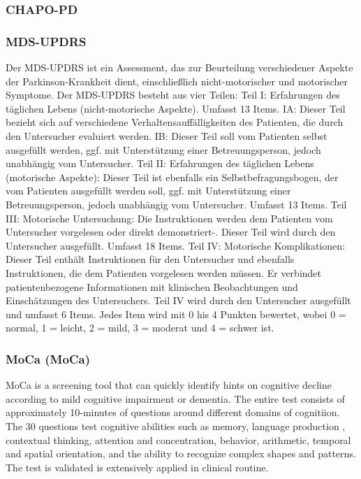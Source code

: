\documentclass[
	a4paper, 
	11.5pt,
	headings=small, 
	twoside, 
	titlepage=firstiscover, 
 	pagesize=auto,
  	version=last,
	open=any,
	BCOR=14mm,
  	chapterprefix=false]{scrbook}
\begin{document}
\subsubsection{\acl{CHAPO-PD}}

\subsubsection{\acl{MDS-UPDRS}}
Der MDS-UPDRS ist ein Assessment, das zur Beurteilung verschiedener Aspekte der Parkinson-Krankheit dient, einschließlich nicht-motorischer und motorischer Symptome. Der MDS-UPDRS besteht aus vier Teilen:
Teil I: Erfahrungen des täglichen Lebens (nicht-motorische Aspekte). Umfasst 13 Items.
IA: Dieser Teil bezieht sich auf verschiedene Verhaltensauffälligkeiten des Patienten, die durch den Untersucher evaluiert werden.
IB: Dieser Teil soll vom Patienten selbst ausgefüllt werden, ggf. mit Unterstützung einer Betreuungsperson, jedoch unabhängig vom Untersucher.
Teil II: Erfahrungen des täglichen Lebens (motorische Aspekte): Dieser Teil ist ebenfalls ein Selbstbefragungsbogen, der vom Patienten ausgefüllt werden soll, ggf. mit Unterstützung einer Betreuungsperson, jedoch unabhängig vom Untersucher. Umfasst 13 Items.
Teil III: Motorische Untersuchung: Die Instruktionen werden dem Patienten vom Untersucher vorgelesen oder direkt demonstriert-. Dieser Teil wird durch den Untersucher ausgefüllt. Umfasst 18 Items.
Teil IV: Motorische Komplikationen: Dieser Teil enthält Instruktionen für den Untersucher und ebenfalls Instruktionen, die dem Patienten vorgelesen werden müssen. Er verbindet patientenbezogene Informationen mit klinischen Beobachtungen und Einschätzungen des Untersuchers. Teil IV wird durch den Untersucher ausgefüllt und umfasst 6 Items.
Jedes Item wird mit 0 his 4 Punkten bewertet, wobei 0 = normal, 1 = leicht, 2 = mild, 3 = moderat und 4 = schwer ist.

\subsubsection{\acl{MoCa} (\acs{MoCa})}
\acl{MoCa} is a screening tool that can quickly identify hints on cognitive decline according to mild cognitive impairment or dementia. The entire test consists of approximately 10-minutes of questions around different domains of cognitiion. The 30 questions test cognitive abilities such as memory, language production , contextual thinking, attention and concentration, behavior, arithmetic, temporal and spatial orientation, and the ability to recognize complex shapes and patterns. The test is validated is extensively applied in clinical routine. 
\end{document}
